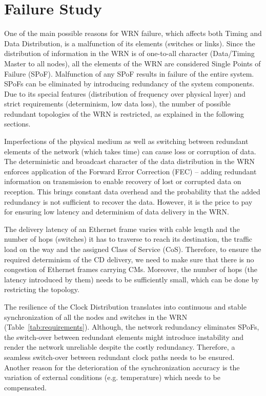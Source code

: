 \section{Failure Study}

One of the main possible reasons for WRN failure, which affects both Timing and Data Distribution, is 
a malfunction of its elements (switches or links). Since the distribution of information 
in the WRN is of one-to-all character (Data/Timing Master to all nodes), all the elements of the WRN are 
considered Single Points of Failure (SPoF)\cite{biblio:mtbf}. Malfunction of any SPoF 
results in failure of the entire system.
SPoFs can be eliminated by introducing redundancy of the system components. Due to its special features 
(distribution of frequency over physical layer) and strict requirements (determinism, low data loss), 
the number of possible redundant topologies of the WRN is restricted, as explained in the 
following sections. 

Imperfections of the physical medium as well as switching between redundant elements of the network 
(which takes time) can cause loss or corruption of data. The deterministic and  broadcast character 
of the data distribution in the WRN enforces application of the Forward Error Correction (FEC) 
-- adding redundant information on transmission to enable recovery of lost or corrupted data 
on reception. This brings constant data overhead and the probability that the added redundancy is 
not sufficient to recover the data. However, it is the price to pay for ensuring low latency 
and determinism of data delivery in the WRN. 

The delivery latency of an Ethernet frame varies with cable length and the number of hops (switches) 
it has to traverse to reach its destination, the traffic load on the way and 
the assigned Class of Service (CoS). Therefore, to ensure the required determinism 
of the CD delivery, we need to make sure that there is no congestion of Ethernet frames 
carrying CMs. Moreover, the number of hops (the latency introduced by them) needs to be 
sufficiently small, which can be done by restricting the topology. 

The resilience of the Clock Distribution translates into continuous and stable 
synchronization of all the nodes and switches in the WRN (Table~\ref{tab:requirements}). Although, 
the network redundancy eliminates SPoFs, the switch-over between redundant elements might introduce 
instability and render the network unreliable despite the costly redundancy. 
Therefore, a seamless switch-over between redundant clock paths needs to be ensured. 
Another reason for the deterioration of the synchronization 
accuracy is the variation of external conditions (e.g. temperature) which needs to be compensated.

